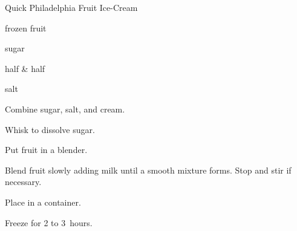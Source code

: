 \begin{recipe}{Quick Philadelphia Fruit Ice-Cream}{}{}

\begin{ingredients}
\item {} frozen fruit
\item \C{1\third} sugar
\item {} half \& half
\item {} salt
\end{ingredients}

\begin{directions}
\item Combine sugar, salt, and cream.
\item Whisk to dissolve sugar.
\item Put fruit in a blender.
\item Blend fruit slowly adding milk until a smooth mixture forms. Stop and stir if necessary.
\item Place in a container.
\item Freeze for 2 to 3~hours.
\end{directions}

\end{recipe}
